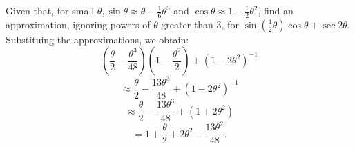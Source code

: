Given that, for small $\theta, \sin\theta \approx \theta - \frac{1}{6}\theta^3$ and $\cos \theta \approx 1 - \frac{1}{2}\theta^2$, find an approximation, ignoring powers of $\theta$ greater than 3, for $\sin(\frac{1}{2}\theta)\cos\theta + \sec 2\theta$.
\newline
Substituing the approximations, we obtain:
\[
\left(\frac{\theta}{2}-\frac{\theta^3}{48}\right)\left(1 - \frac{\theta^2}{2}\right) + (1 -2\theta^2)^{-1}
\]
\[
\approx \frac{\theta}{2} - \frac{13\theta^3}{48} + (1-2\theta^2)^{-1}
\]
\[
\approx \frac{\theta}{2} - \frac{13\theta^3}{48} + (1+2\theta^2)
\]
\[
= 1 + \frac{\theta}{2} + 2\theta^2 -\frac{13\theta^2}{48}.
\]